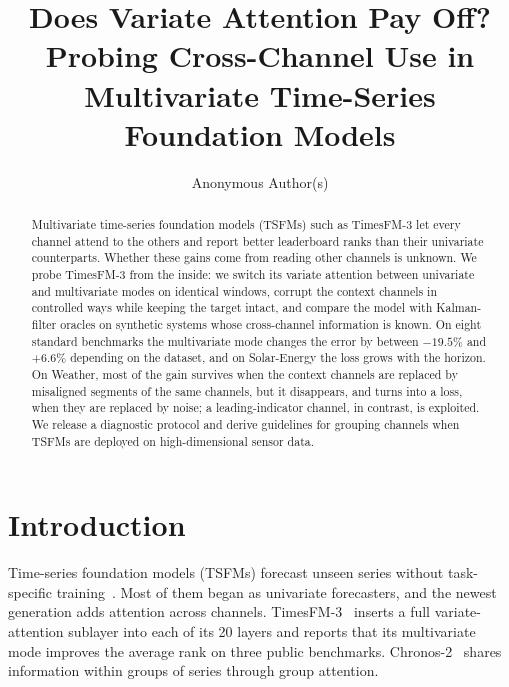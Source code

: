 \documentclass[runningheads]{llncs}
\newif\ifshowtodos
\newcommand{\todo}[1]{\ifshowtodos\textcolor{red}{[TODO: #1]}\fi}
\newcommand{\tfm}{TimesFM-3}
\begin{document}
\title{Does Variate Attention Pay Off? Probing Cross-Channel Use in
Multivariate Time-Series Foundation Models}
\author{Anonymous Author(s)}
\maketitle

\begin{abstract}
Multivariate time-series foundation models (TSFMs) such as \tfm{} let every
channel attend to the others and report better leaderboard ranks than their
univariate counterparts. Whether these gains come from reading other channels
is unknown. We probe \tfm{} from the inside: we switch its variate attention
between univariate and multivariate modes on identical windows, corrupt the
context channels in controlled ways while keeping the target intact, and
compare the model with Kalman-filter oracles on synthetic systems whose
cross-channel information is known. On eight standard benchmarks the
multivariate mode changes the error by between $-19.5\%$ and $+6.6\%$
depending on the dataset, and on Solar-Energy the loss grows with the
horizon. On Weather, most of the gain survives when the context channels are
replaced by misaligned segments of the same channels, but it disappears, and
turns into a loss, when they are replaced by noise; a leading-indicator
channel, in contrast, is exploited. \todo{E3 and E5 findings.} We release a
diagnostic protocol and derive guidelines for grouping channels when TSFMs
are deployed on high-dimensional sensor data.
\end{abstract}

\section{Introduction}\label{sec:intro}

Time-series foundation models (TSFMs) forecast unseen series without
task-specific training~\cite{das2024timesfm,ansari2024chronos,woo2024moirai}.
Most of them began as univariate forecasters, and the newest generation adds
attention across channels. \tfm{}~\cite{timesfm3_blog2026} inserts a full
variate-attention sublayer into each of its 20 layers and reports that its
multivariate mode improves the average rank on three public benchmarks.
Chronos-2~\cite{ansari2025chronos2} shares information within groups of
series through group attention.
\end{document}
